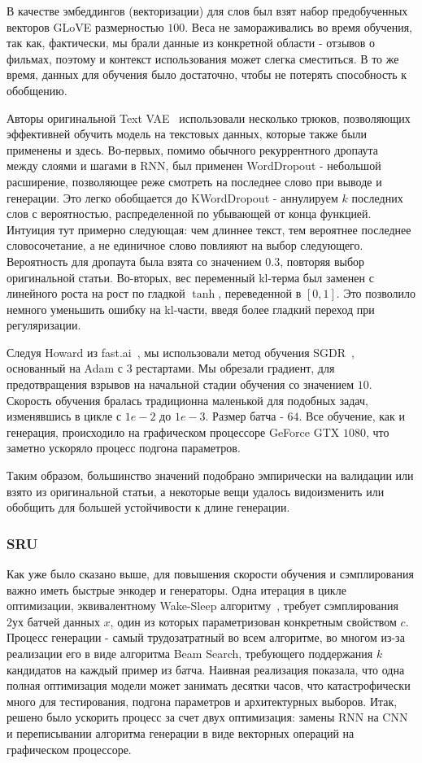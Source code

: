 \documentclass{spbau-diploma}
\begin{document}
В качестве эмбеддингов (векторизации) для слов был взят набор предобученных
векторов GLoVE размерностью $100$. Веса не замораживались во время обучения,
так как, фактически, мы брали данные из конкретной области - отзывов о фильмах,
поэтому и контекст использования может слегка сместиться. В то же время, данных
для обучения было достаточно, чтобы не потерять способность к обобщению.

Авторы оригинальной Text VAE~\cite{text_vae} использовали несколько трюков, 
позволяющих эффективней обучить модель на текстовых данных, которые также были 
применены и здесь. Во-первых, помимо обычного рекуррентного 
дропаута~\cite{wiki:dropout} между слоями и шагами в RNN, был применен 
WordDropout - небольшой расширение, позволяющее реже смотреть на последнее 
слово при выводе и генерации. Это легко обобщается до KWordDropout - аннулируем
$k$ последних слов с вероятностью, распределенной по убывающей от конца 
функцией. Интуиция тут примерно следующая: чем длиннее текст, тем вероятнее 
последнее словосочетание, а не единичное слово повлияют на выбор следующего. 
Вероятность для дропаута была взята со значением $0.3$, повторяя выбор 
оригинальной статьи. Во-вторых, вес переменный kl-терма был заменен с 
линейного роста на рост по гладкой $\tanh$, переведенной в $[0, 1]$. Это 
позволило немного уменьшить ошибку на kl-части, введя более гладкий переход 
при регуляризации.

Следуя Howard из fast.ai~\cite{fastai}, мы использовали метод обучения 
SGDR~\cite{1608.03983}, основанный на Adam с $3$ рестартами. Мы обрезали 
градиент, для предотвращения взрывов на начальной стадии обучения со значением
$10$. Скорость обучения бралась традиционна маленькой для подобных задач, 
изменявшись в цикле с $1e-2$ до $1e-3$. Размер батча - $64$. Все обучение, как 
и генерация, происходило на графическом процессоре GeForce GTX $1080$, что
заметно ускоряло процесс подгона параметров.

Таким образом, большинство значений подобрано эмпирически на валидации или 
взято из оригинальной статьи, а некоторые вещи удалось видоизменить или 
обобщить для большей устойчивости к длине генерации.

\subsubsection{SRU}
Как уже было сказано выше, для повышения скорости обучения и сэмплирования 
важно иметь быстрые энкодер и генераторы. Одна итерация в цикле оптимизации, 
эквивалентному Wake-Sleep алгоритму~\cite{text_cvae}, требует сэмплирования 2ух
батчей данных $x$, один из которых параметризован конкретным свойством $c$.
Процесс генерации - самый трудозатратный во всем алгоритме, во многом из-за
реализации его в виде алгоритма Beam Search, требующего поддержания $k$ 
кандидатов на каждый пример из батча. Наивная реализация показала, что 
одна полная оптимизация модели может занимать десятки часов, что 
катастрофически много для тестирования, подгона параметров и архитектурных 
выборов. Итак, решено было ускорить процесс за счет двух оптимизация: замены 
RNN на CNN и переписывании алгоритма генерации в виде векторных операций на 
графическом процессоре.
\end{document}
